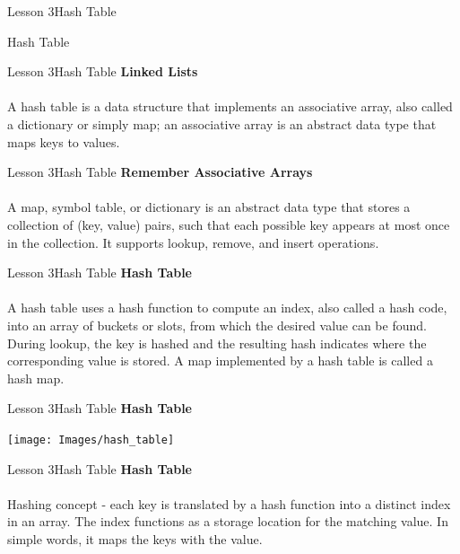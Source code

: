 \documentclass[aspectratio=1610]{beamer}
\begin{document}
\begin{frame}{Lesson 3}{Hash Table}
\begin{center}
\Huge Hash Table
\end{center}
\end{frame}


\begin{frame}{Lesson 3}{Hash Table}
\LARGE
\textbf{Linked Lists}\\~\\
A hash table is a data structure that implements an associative array, also
called a dictionary or simply map; an associative array is an abstract data type
that maps keys to values.
\end{frame}

\begin{frame}{Lesson 3}{Hash Table}
\LARGE
\textbf{Remember Associative Arrays}\\~\\
A map, symbol table, or dictionary is an abstract data type that stores a
collection of (key, value) pairs, such that each possible key appears at most
once in the collection. It supports lookup, remove, and insert operations. 
\end{frame}


\begin{frame}{Lesson 3}{Hash Table}
\LARGE
\textbf{Hash Table}\\~\\
A hash table uses a hash function to compute an index, also called a hash code,
into an array of buckets or slots, from which the desired value can be found.
During lookup, the key is hashed and the resulting hash indicates where the
corresponding value is stored. A map implemented by a hash table is called a hash
map.
\end{frame}

\begin{frame}{Lesson 3}{Hash Table}
\LARGE
\textbf{Hash Table}\\
\begin{center}
\texttt{[image: Images/hash\_table]}
\end{center}
\end{frame}


\begin{frame}{Lesson 3}{Hash Table}
\LARGE
\textbf{Hash Table}\\~\\
Hashing concept - each key is translated by a hash function into a 
distinct index in an array. The index functions as a storage location for the
matching value. In simple words, it maps the keys with the value.
\end{frame}
\end{document}
